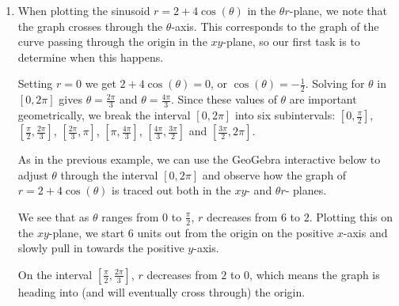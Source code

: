 \documentclass{ximera}
\begin{document}
\begin{example}
\begin{explanation}
\begin{enumerate}
Over the interval $\left[\pi, \frac{3\pi}{2}\right]$, we see that $r$ increases from $4$ to $6$.  On the $xy$-plane, the curve sweeps out away from the origin as it travels from the negative $x$-axis  to the negative $y$-axis.

Finally, as $\theta$ takes on values from $\frac{3\pi}{2}$ to $2\pi$, $r$ decreases from $6$ back to $4$.  The graph on the $xy$-plane pulls in from the negative $y$-axis to finish where we started. 

We leave it to the reader to verify that plotting points corresponding to values of $\theta$ outside the interval $[0,2\pi]$ results in retracing portions of the curve, so we are finished.

\item When plotting the sinusoid $r = 2 + 4\cos(\theta)$ in the $\theta r$-plane, we note that the graph crosses through the $\theta$-axis.  This corresponds to the graph of the curve passing through the origin in the $xy$-plane, so our first task is to determine when this happens.  

Setting $r=0$ we get $2 + 4\cos(\theta) = 0$, or $\cos(\theta) = -\frac{1}{2}$.   Solving for $\theta$ in  $[0,2\pi]$ gives $\theta = \frac{2\pi}{3}$ and $\theta = \frac{4\pi}{3}$.   Since these values of $\theta$ are important geometrically, we break the interval $[0,2\pi]$ into six subintervals:  $\left[0,\frac{\pi}{2}\right]$, $\left[\frac{\pi}{2},\frac{2\pi}{3}\right]$, $\left[\frac{2\pi}{3},\pi\right]$, $\left[\pi,\frac{4\pi}{3}\right]$, $\left[\frac{4\pi}{3}, \frac{3\pi}{2}\right]$ and $\left[\frac{3\pi}{2}, 2\pi\right]$.  

As in the previous example, we can use the GeoGebra interactive below to adjust $\theta$ through the interval $[0, 2\pi]$ and observe how the graph of $r = 2 + 4\cos(\theta)$ is traced out both in the $xy$- and $\theta r$- planes.

\begin{center}
\end{center}

We see that as $\theta$ ranges from $0$ to $\frac{\pi}{2}$, $r$ decreases from $6$ to $2$.  Plotting this on the $xy$-plane, we start $6$ units out from the origin on the positive $x$-axis and slowly pull in towards the positive $y$-axis.


On the interval $\left[\frac{\pi}{2}, \frac{2\pi}{3}\right]$, $r$ decreases from $2$ to $0$, which means the graph is heading into (and will eventually cross through) the origin.  



\end{enumerate}
\end{explanation}
\end{example}
\end{document}
